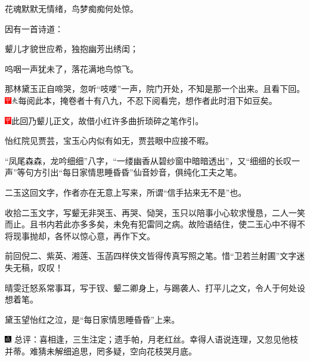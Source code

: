 花魂默默无情绪，鸟梦痴痴何处惊。

因有一首诗道：

颦儿才貌世应希，独抱幽芳出绣闺；

呜咽一声犹未了，落花满地鸟惊飞。

那林黛玉正自啼哭，忽听``吱喽''一声，院门开处，不知是那一个出来。且看下回。{\includegraphics[width=3mm]{../Images/00002}\includegraphics[width=3mm]{../Images/00012}\footnotesize \kaishu 每阅此本，掩卷者十有八九，不忍下阅看完，想作者此时泪下如豆矣。}

\includegraphics[width=3mm]{../Images/00002}{此回乃颦儿正文，故借小红许多曲折琐碎之笔作引。}

{怡红院见贾芸，宝玉心内似有如无，贾芸眼中应接不暇。}

{``凤尾森森，龙吟细细''八字，``一缕幽香从碧纱窗中暗暗透出''，又``细细的长叹一声''等句方引出``每日家情思睡昏昏''仙音妙音，俱纯化工夫之笔。}

{二玉这回文字，作者亦在无意上写来，所谓``信手拈来无不是''也。}

{收拾二玉文字，写颦无非哭玉、再哭、恸哭，玉只以陪事小心软求慢恳，二人一笑而止。且书内若此亦多多矣，未免有犯雷同之病。故险语结住，使二玉心中不得不将现事抛却，各怀以惊心意，再作下文。}

{前回倪二、紫英、湘莲、玉菡四样侠文皆得传真写照之笔。惜``卫若兰射圃''文字迷失无稿，叹叹！}

{晴雯迁怒系常事耳，写于钗、颦二卿身上，与踢袭人、打平儿之文，令人于何处设想着笔。}

{黛玉望怡红之泣，是``每日家情思睡昏昏''上来。}

{\includegraphics[width=3mm]{../Images/00005}  \kaishu 总评：喜相逢，三生注定；遗手帕，月老红丝。幸得人语说连理，又忽见他枝并蒂。难猜未解细追思，罔多疑，空向花枝哭月底。}

